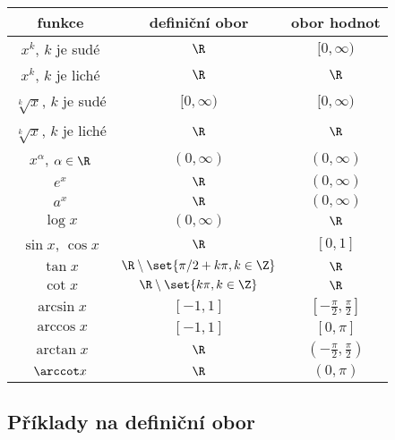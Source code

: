 \begin{table}[H]
    \centering
    \begin{tabular}{||c|c|c||}
        \hline \hline
        funkce & definiční obor & obor hodnot \\
        \hline
        $x^k$, $k$ je sudé              & $\R$          & $[0, \infty)$ \\ 
        $x^k$, $k$ je liché             & $\R$          & $\R$ \\ 
        $\sqrt[k]{x}$, $k$ je sudé      & $[0, \infty)$ & $[0, \infty)$ \\
        $\sqrt[k]{x}$, $k$ je liché     & $\R$          & $\R$ \\
        $x^\alpha$, $\alpha \in \R$     & $(0, \infty)$ & $(0, \infty)$ \\
        $e^x$                           & $\R$          & $(0, \infty)$ \\
        $a^x$                           & $\R$          & $(0, \infty)$ \\
        $\log x$                        & $(0, \infty)$ & $\R$ \\
        $\sin x$, $\cos x$              & $\R$          & $[0,1]$ \\
        $\tan x$                        & $\R \setminus \set{\pi/2 + k \pi, k \in \Z}$ & $\R$ \\
        $\cot x$                        & $\R \setminus \set{k \pi, k \in \Z}$  & $\R$ \\
        $\arcsin x$                     & $[-1,1]$      & $[-\frac{\pi}{2}, \frac{\pi}{2}]$ \\
        $\arccos x$                     & $[-1,1]$      & $[0,\pi]$ \\
        $\arctan x$                     & $\R$          & $(-\frac{\pi}{2}, \frac{\pi}{2})$ \\
        $\arccot x$                     & $\R$          & $(0,\pi)$ \\
         \hline \hline
    \end{tabular}
    
\end{table}

\subsection{Příklady na definiční obor}

